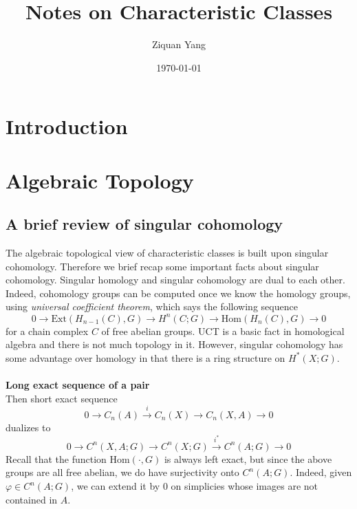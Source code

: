 \documentclass[12pt]{article}
\theoremstyle{plain}
\theoremstyle{definition}
\newcommand{\Hom}{\mathrm{Hom}}
\newcommand{\<}{\langle}
\renewcommand{\>}{\rangle}
\newcommand{\Ext}{\mathrm{Ext}}
\begin{document}
\title{Notes on Characteristic Classes}
\author{Ziquan Yang}


\date{\today}

\maketitle
 
\tableofcontents

\section{Introduction}
\section{Algebraic Topology}
\subsection{A brief review of singular cohomology}

The algebraic topological view of characteristic classes is built upon singular cohomology. Therefore we brief recap some important facts about singular cohomology. Singular homology and singular cohomology are dual to each other. Indeed, cohomology groups can be computed once we know the homology groups, using \textit{universal coefficient theorem}, which says the following sequence 
$$ 0 \to \Ext(H_{n - 1}(C), G) \to H^n(C; G) \to \Hom(H_n(C), G) \to 0 $$
for a chain complex $C$ of free abelian groups. UCT is a basic fact in homological algebra and there is not much topology in it. However, singular cohomology has some advantage over homology in that there is a ring structure on $H^*(X; G)$.  \\\\
\textbf{Long exact sequence of a pair}\\
Then short exact sequence 
$$ 0 \to C_n(A) \stackrel{i}{\to} C_n(X) \to C_n(X, A) \to 0 $$
dualizes to 
$$ 0 \to C^n(X, A; G) \to C^n(X; G) \stackrel{i^*}{\to} C^n(A; G) \to 0 $$
Recall that the function $\Hom(\cdot, G)$ is always left exact, but since the above groups are all free abelian, we do have surjectivity onto $C^n(A; G)$. Indeed, given $\varphi \in C^n(A; G)$, we can extend it by $0$ on simplicies whose images are not contained in $A$. 
\end{document}
